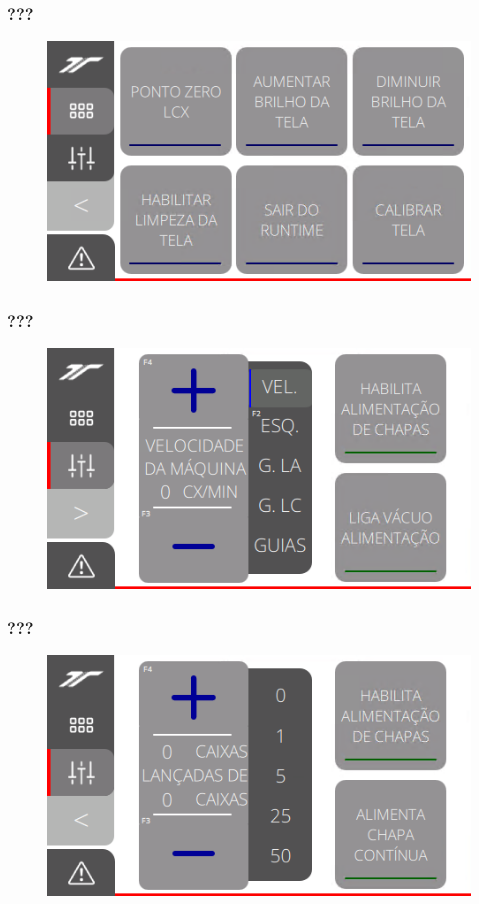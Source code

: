 \subsubsection{\small{???}}
\begin{figure}[h]
  \centering
  \includegraphics{src/imagesFlexo/11-IHMALM/e-3.png}
\end{figure}
\vspace*{\fill}

\newpage
\thispagestyle{fancy}
\vspace*{\fill}
\subsubsection{\small{???}}
\begin{figure}[h]
  \centering
  \includegraphics{src/imagesFlexo/11-IHMALM/e-4.png}
\end{figure}
\vspace*{\fill}

\newpage
\thispagestyle{fancy}
\vspace*{\fill}
\subsubsection{\small{???}}
\begin{figure}[h]
  \centering
  \includegraphics{src/imagesFlexo/11-IHMALM/e-5.png}
\end{figure}
\vspace*{\fill}